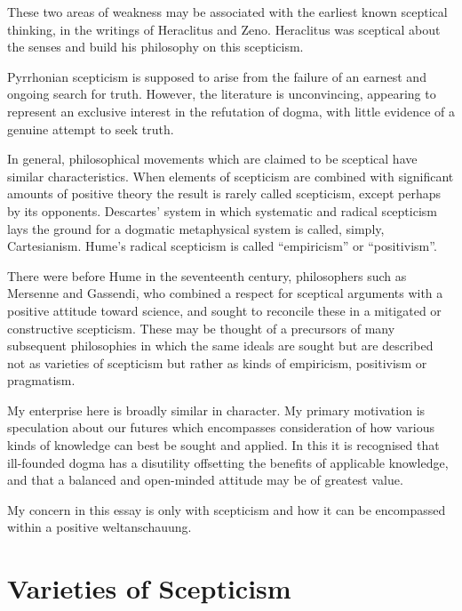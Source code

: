 \documentclass{rbjk}
\begin{document}
\begin{article}
These two areas of weakness may be associated with the earliest known sceptical thinking, in the writings of Heraclitus and Zeno.
Heraclitus was sceptical about the senses and build his philosophy on this scepticism.



Pyrrhonian scepticism is supposed to arise from the failure of an earnest and ongoing search for truth.
However, the literature is unconvincing, appearing to represent an exclusive interest in the refutation of dogma, with little evidence of a genuine attempt to seek truth.

In general, philosophical movements which are claimed to be sceptical have similar characteristics.
When elements of scepticism are combined with significant amounts of positive theory the result is rarely called scepticism, except perhaps by its opponents.
Descartes' system in which systematic and radical scepticism lays the ground for a dogmatic metaphysical system is called, simply, Cartesianism.
Hume's radical scepticism is called ``empiricism'' or ``positivism''.

There were before Hume in the seventeenth century, philosophers such as Mersenne and Gassendi, who combined a respect for sceptical arguments with a positive attitude toward science, and sought to reconcile these in a mitigated or constructive scepticism.
These may be thought of a precursors of many subsequent philosophies in which the same ideals are sought but are described not as varieties of scepticism but rather as kinds of empiricism, positivism or pragmatism.

My enterprise here is broadly similar in character.
My primary motivation is speculation about our futures which encompasses consideration of how various kinds of knowledge can best be sought and applied.
In this it is recognised that ill-founded dogma has a disutility offsetting the benefits of applicable knowledge, and that a balanced and open-minded attitude may be of greatest value.

My concern in this essay is only with scepticism and how it can be encompassed within a positive weltanschauung.

\section{Varieties of Scepticism}

 

%
%

\end{article}
\end{document}
